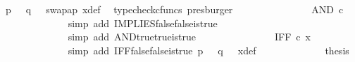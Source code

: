 \begin{isabellebody}
\ {\isacartoucheopen}p\ {\isacharequal}{\kern0pt}\ {\isasymf}{\isacartoucheclose}\ {\isacartoucheopen}q\ {\isacharequal}{\kern0pt}\ {\isasymf}{\isacartoucheclose}\ swap{\isacharunderscore}{\kern0pt}ap\ x{\isacharunderscore}{\kern0pt}def\ \isamarkupfalse%
\ {\isacharparenleft}{\kern0pt}typecheck{\isacharunderscore}{\kern0pt}cfuncs{\isacharcomma}{\kern0pt}\ presburger{\isacharparenright}{\kern0pt}\isanewline
\ \ \ \ \ \ \ \ \ \ \isamarkupfalse%
\ \isamarkupfalse%
\ {\isachardoublequoteopen}{\isachardot}{\kern0pt}{\isachardot}{\kern0pt}{\isachardot}{\kern0pt}\ {\isacharequal}{\kern0pt}\ AND\ {\isasymcirc}\isactrlsub c\ {\isasymlangle}{\isasymt}{\isacharcomma}{\kern0pt}\ {\isasymt}{\isasymrangle}{\isachardoublequoteclose}\isanewline
\ \ \ \ \ \ \ \ \ \ \ \ \isamarkupfalse%
\ {\isacharparenleft}{\kern0pt}simp\ add{\isacharcolon}{\kern0pt}\ IMPLIES{\isacharunderscore}{\kern0pt}false{\isacharunderscore}{\kern0pt}false{\isacharunderscore}{\kern0pt}is{\isacharunderscore}{\kern0pt}true{\isacharparenright}{\kern0pt}\isanewline
\ \ \ \ \ \ \ \ \ \ \isamarkupfalse%
\ \isamarkupfalse%
\ {\isachardoublequoteopen}{\isachardot}{\kern0pt}{\isachardot}{\kern0pt}{\isachardot}{\kern0pt}\ {\isacharequal}{\kern0pt}\ {\isasymt}{\isachardoublequoteclose}\isanewline
\ \ \ \ \ \ \ \ \ \ \ \ \isamarkupfalse%
\ {\isacharparenleft}{\kern0pt}simp\ add{\isacharcolon}{\kern0pt}\ AND{\isacharunderscore}{\kern0pt}true{\isacharunderscore}{\kern0pt}true{\isacharunderscore}{\kern0pt}is{\isacharunderscore}{\kern0pt}true{\isacharparenright}{\kern0pt}\isanewline
\ \ \ \ \ \ \ \ \ \ \isamarkupfalse%
\ \isamarkupfalse%
\ {\isachardoublequoteopen}{\isachardot}{\kern0pt}{\isachardot}{\kern0pt}{\isachardot}{\kern0pt}\ {\isacharequal}{\kern0pt}\ IFF\ {\isasymcirc}\isactrlsub c\ x{\isachardoublequoteclose}\isanewline
\ \ \ \ \ \ \ \ \ \ \ \ \isamarkupfalse%
\ {\isacharparenleft}{\kern0pt}simp\ add{\isacharcolon}{\kern0pt}\ IFF{\isacharunderscore}{\kern0pt}false{\isacharunderscore}{\kern0pt}false{\isacharunderscore}{\kern0pt}is{\isacharunderscore}{\kern0pt}true\ {\isacartoucheopen}p\ {\isacharequal}{\kern0pt}\ {\isasymf}{\isacartoucheclose}\ {\isacartoucheopen}q\ {\isacharequal}{\kern0pt}\ {\isasymf}{\isacartoucheclose}\ x{\isacharunderscore}{\kern0pt}def{\isacharparenright}{\kern0pt}\isanewline
\ \ \ \ \ \ \ \ \ \ \isamarkupfalse%
\ \isamarkupfalse%
\ {\isacharquery}{\kern0pt}thesis\isanewline
\ \ \ \ \ \ \ \ \ \ \ \ \isamarkupfalse%

\end{isabellebody}

